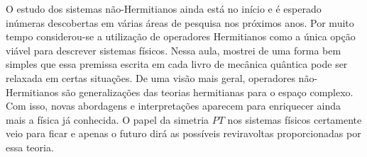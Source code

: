 \documentclass{article}
\begin{document}
O estudo dos sistemas não-Hermitianos ainda está no início e é esperado inúmeras descobertas em várias áreas de pesquisa nos próximos anos. Por muito tempo considerou-se a utilização de operadores Hermitianos como a única opção viável para descrever sistemas físicos. Nessa aula, mostrei de uma forma bem simples que essa premissa escrita em cada livro de mecânica quântica pode ser relaxada em certas situações. De uma visão mais geral, operadores não-Hermitianos são generalizações das teorias hermitianas para o espaço complexo. Com isso, novas abordagens e interpretações aparecem para enriquecer ainda mais a física já conhecida. O papel da simetria $PT$ nos sistemas físicos certamente veio para ficar e apenas o futuro dirá as possíveis reviravoltas proporcionadas por essa teoria.
\end{document}

